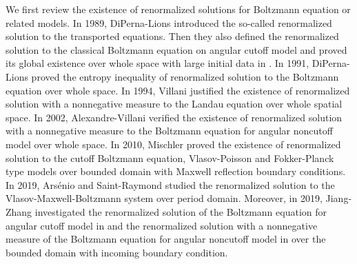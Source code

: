 \documentclass[reqno,11pt]{amsart}
\numberwithin{equation}{section}
\begin{document}
We first review the existence of renormalized solutions for Boltzmann equation or related models. In 1989, DiPerna-Lions \cite{DiPerna-Lions-Inv} introduced the so-called renormalized solution to the transported equations. Then they also defined the renormalized solution to the classical Boltzmann equation on angular cutoff model and proved its global existence over whole space with large initial data in \cite{Diperna-Lions}. In 1991, DiPerna-Lions \cite{DL-ARMA-1991} proved the entropy inequality of renormalized solution to the Boltzmann equation over whole space. In 1994, Villani \cite{Villani-ADE-1966} justified the existence of renormalized solution with a nonnegative measure to the Landau equation over whole spatial space. In 2002, Alexandre-Villani \cite{AV-CPAM-2002} verified the existence of renormalized solution with a nonnegative measure to the Boltzmann equation for angular noncutoff model over whole space. In 2010, Mischler \cite{Mischler-ASENS-2010} proved the existence of renormalized solution to the cutoff Boltzmann equation, Vlasov-Poisson and Fokker-Planck type models over bounded domain with Maxwell reflection boundary conditions. In 2019, Ars\'enio and Saint-Raymond \cite{DSR-2019-BOOK} studied the renormalized solution to the Vlasov-Maxwell-Boltzmann system over period domain. Moreover, in 2019, Jiang-Zhang investigated the renormalized solution of the Boltzmann equation for angular cutoff model in \cite{JZ-SIMA-2019} and the renormalized solution with a nonnegative measure of the Boltzmann equation for angular noncutoff model in \cite{JZ-JDE-2019} over the bounded domain with incoming boundary condition.
\end{document}
